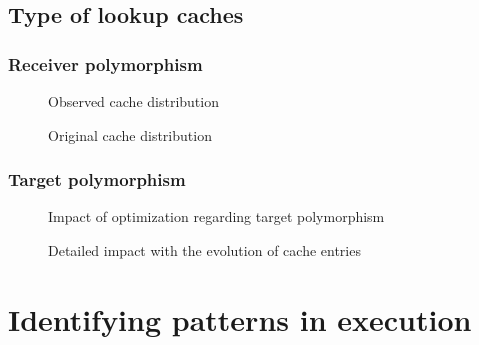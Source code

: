 \documentclass[preprint]{acmart}
\begin{document}
\subsection{Type of lookup caches}

\subsubsection{Receiver polymorphism}

\begin{figure}[h]
  \centering
  \CacheDistribObservedSplitting
  \caption{
    Observed cache distribution}
\end{figure}


\begin{figure}[h]
  \centering
  \CacheDistribOriginalSplitting
  \caption{
    Original cache distribution}
\end{figure}


\subsubsection{Target polymorphism}

\begin{figure}[h]
  \centering
  \TargetPolymorphism
  \caption{
    Impact of optimization regarding target polymorphism}
\end{figure}

\begin{figure}[h]
  \centering
  \TargetPolymorphismDetails
  \caption{
    Detailed impact with the evolution of cache entries}
\end{figure}


%
%



\section{Identifying patterns in execution}
\end{document}
